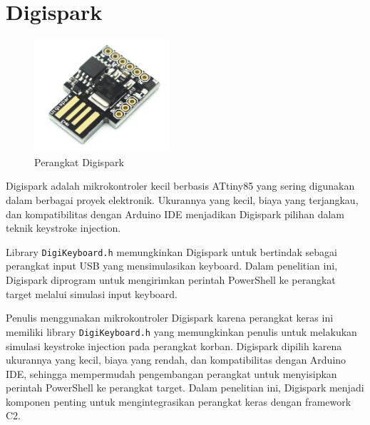 \section{Digispark}

\begin{figure}
	\centering
	\includegraphics[width=0.45\textwidth]
		{assets/pics/Digispark.png}
	\caption{Perangkat Digispark}
	\label{fig:testGambar}
\end{figure}


Digispark adalah mikrokontroler kecil berbasis ATtiny85 yang sering digunakan dalam berbagai proyek elektronik. Ukurannya yang kecil, biaya yang terjangkau, dan kompatibilitas dengan Arduino IDE menjadikan Digispark pilihan dalam teknik keystroke injection\citep{latham2019digispark}.


Library \verb|DigiKeyboard.h| memungkinkan Digispark untuk bertindak sebagai perangkat input USB yang mensimulasikan keyboard. Dalam penelitian ini, Digispark diprogram untuk mengirimkan perintah PowerShell ke perangkat target melalui simulasi input keyboard\citep{digikeyboard}.

 
Penulis menggunakan mikrokontroler Digispark karena perangkat keras ini memiliki library \verb|DigiKeyboard.h| yang memungkinkan penulis untuk melakukan simulasi keystroke injection pada perangkat korban. Digispark dipilih karena ukurannya yang kecil, biaya yang rendah, dan kompatibilitas dengan Arduino IDE, sehingga mempermudah pengembangan perangkat untuk menyisipkan perintah PowerShell ke perangkat target. Dalam penelitian ini, Digispark menjadi komponen penting untuk mengintegrasikan perangkat keras dengan framework C2. 

